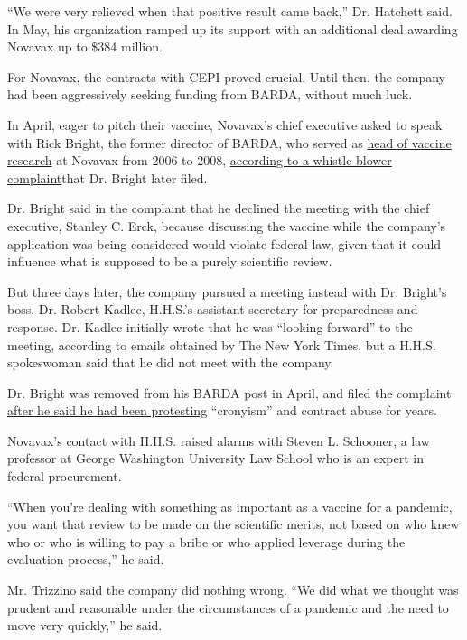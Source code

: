 ``We were very relieved when that positive result came back,'' Dr.
Hatchett said. In May, his organization ramped up its support with an
additional deal awarding Novavax up to \$384 million.

For Novavax, the contracts with CEPI proved crucial. Until then, the
company had been aggressively seeking funding from BARDA, without much
luck.

In April, eager to pitch their vaccine, Novavax's chief executive asked
to speak with Rick Bright, the former director of BARDA, who served as
\href{https://ir.novavax.com/news-releases/news-release-details/novavax-appoints-new-vice-president-vaccine-research}{head
of vaccine research} at Novavax from 2006 to 2008,
\href{https://www.cnn.com/2020/05/05/politics/rick-bright-full-complaint/index.html}{according
to a whistle-blower complaint}that Dr. Bright later filed.

Dr. Bright said in the complaint that he declined the meeting with the
chief executive, Stanley C. Erck, because discussing the vaccine while
the company's application was being considered would violate federal
law, given that it could influence what is supposed to be a purely
scientific review.

But three days later, the company pursued a meeting instead with Dr.
Bright's boss, Dr. Robert Kadlec, H.H.S.'s assistant secretary for
preparedness and response. Dr. Kadlec initially wrote that he was
``looking forward'' to the meeting, according to emails obtained by The
New York Times, but a H.H.S. spokeswoman said that he did not meet with
the company.

Dr. Bright was removed from his BARDA post in April, and filed the
complaint
\href{https://www.nytimes.com/2020/05/09/us/politics/whistle-blower-trump-coronavirus.html}{after
he said he had been protesting} ``cronyism'' and contract abuse for
years.

Novavax's contact with H.H.S. raised alarms with Steven L. Schooner, a
law professor at George Washington University Law School who is an
expert in federal procurement.

``When you're dealing with something as important as a vaccine for a
pandemic, you want that review to be made on the scientific merits, not
based on who knew who or who is willing to pay a bribe or who applied
leverage during the evaluation process,'' he said.

Mr. Trizzino said the company did nothing wrong. ``We did what we
thought was prudent and reasonable under the circumstances of a pandemic
and the need to move very quickly,'' he said.


